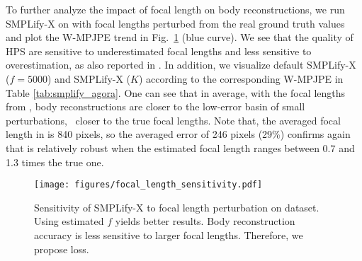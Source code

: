 \documentclass[10pt,twocolumn,letterpaper,usenames,dvipsnames]{article}
\begin{document}
To further analyze the impact of focal length on body reconstructions, we run SMPLify-X on \agoracam with focal lengths perturbed from the real ground truth values
and plot the W-MPJPE trend in Fig.~\ref{fig:f_sensitivity} (blue curve).
We see that the quality of HPS are sensitive to underestimated focal lengths and less sensitive to overestimation, as also reported in \cite{kissosECCVW2020,yu2020pcls}.
In addition, we visualize default SMPLify-X ($f=5000$) and SMPLify-X (\camcalib $K$) according to the corresponding W-MPJPE in Table \ref{tab:smplify_agora}.
One can see that in average, with the focal lengths from \camcalib, body reconstructions are closer to the low-error basin of small perturbations, \ie~closer to the true focal lengths. 
Note that, the averaged focal length in \agoracam is 840 pixels, so the averaged error of 246 pixels (29\%) confirms again that \smplify is relatively robust when the estimated focal length ranges between 0.7 and 1.3 times the true one.
\begin{table}[]
    \centering
    \caption{{\bf HPS optimization with an estimated camera.}  \smplify on the \agoracam dataset.} \label{tab:smplify_agora}
\end{table} 
\begin{figure}
    \centering
    \texttt{[image: figures/focal\_length\_sensitivity.pdf]}
    \caption{Sensitivity of SMPLify-X to focal length perturbation on \agoracam dataset. Using \camcalib estimated $f$ yields better results. Body reconstruction accuracy is less sensitive to larger focal lengths. Therefore, we propose \softbiasedltwo loss.}
    \label{fig:f_sensitivity}
\end{figure}
\end{document}
